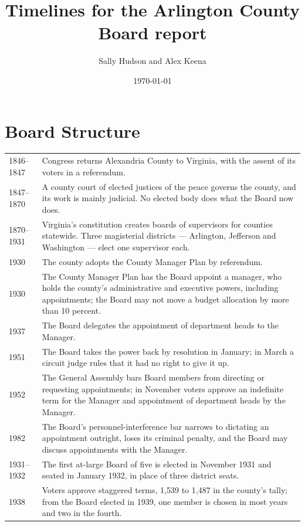 \documentclass[11pt]{article}
\title{Timelines for the Arlington County Board report}
\author{Sally Hudson and Alex Keena}
\date{\today}
\makeatletter
\newcommand{\timeline}[1]{%
  \begin{center}
  \begin{tabular}{@{}p{0.17\textwidth}p{0.77\textwidth}@{}}
    \toprule
    #1
    \bottomrule
  \end{tabular}
  \end{center}}
\let\oldsection\section
\renewcommand{\section}{\clearpage\oldsection}
\makeatother
\begin{document}
\maketitle

\section{Board Structure}

\timeline{
  1846--1847 & Congress returns Alexandria County to Virginia, with the assent of
  its voters in a referendum.\autocite{usstat1846retrocession} \\[2pt]
  1847--1870 & A county court of elected justices of the peace governs the county,
  and its work is mainly judicial. No elected body does what the Board now
  does.\autocite[art.~VI, secs.~25--27]{vaconstitution1851} \\[2pt]
  1870--1931 & Virginia's constitution creates boards of supervisors for counties
  statewide. Three magisterial districts --- Arlington, Jefferson and
  Washington --- elect one supervisor each.\autocite[art.~VII,
  sec.~2]{vaconstitution1869} \\[2pt]
  1930 & The county adopts the County Manager Plan by
  referendum.\autocite{samuel2026} \\[2pt]
  1930 & The County Manager Plan has the Board appoint a manager, who holds the
  county's administrative and executive powers, including appointments; the
  Board may not move a budget allocation by more than 10
  percent.\autocite{vaacts1930c167} \\[2pt]
  1937 & The Board delegates the appointment of department heads to the
  Manager.\autocite{sun1951rulingboard} \\[2pt]
  1951 & The Board takes the power back by resolution in January; in March a
  circuit judge rules that it had no right to give it up.%
  \autocite{dailysun1951spicer,sun1951rulingboard} \\[2pt]
  1952 & The General Assembly bars Board members from directing or requesting
  appointments; in November voters approve an indefinite term for the Manager
  and appointment of department heads by the Manager.%
  \autocite{vaacts1952c443,vaacts1952c198} \\[2pt]
  1982 & The Board's personnel-interference bar narrows to dictating an
  appointment outright, loses its criminal penalty, and the Board may discuss
  appointments with the Manager.\autocite{vaacts1982c108} \\[2pt]
  1931--1932 & The first at-large Board of five is elected in November 1931 and
  seated in January 1932, in place of three district seats. \\[2pt]
  1938 & Voters approve staggered terms, 1,539 to 1,487 in the county's tally;
  from the Board elected in 1939, one member is chosen in most years and two in
  the fourth.\autocite[11]{arlingtonelections2021} \\
}
\end{document}
